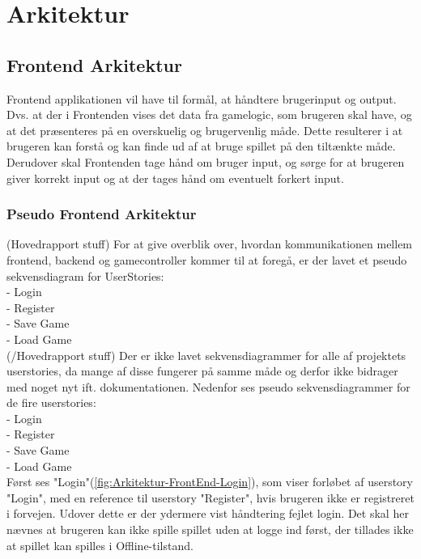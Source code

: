 \section{Arkitektur}
\subsection{Frontend Arkitektur}

Frontend applikationen vil have til formål, at håndtere brugerinput og output. Dvs. at der i Frontenden vises det data fra gamelogic, som brugeren skal have, og at det præsenteres på en overskuelig og brugervenlig måde. Dette resulterer i at brugeren kan forstå og kan finde ud af at bruge spillet på den tiltænkte måde.
Derudover skal Frontenden tage hånd om bruger input, og sørge for at brugeren giver korrekt input og at der tages hånd om eventuelt forkert input.

\subsubsection{Pseudo Frontend Arkitektur}
(Hovedrapport stuff)
For at give overblik over, hvordan kommunikationen mellem frontend, backend og gamecontroller kommer til at foregå, er der lavet et pseudo sekvensdiagram for UserStories:
\\
- Login\\
- Register\\
- Save Game\\
- Load Game\\
(/Hovedrapport stuff)
Der er ikke lavet sekvensdiagrammer for alle af projektets userstories, da mange af disse fungerer på samme måde og derfor ikke bidrager med noget nyt ift. dokumentationen.
Nedenfor ses pseudo sekvensdiagrammer for de fire userstories:\\
- Login\\
- Register\\
- Save Game\\
- Load Game\\

\noindent Først ses "Login"(\autoref{fig:Arkitektur-FrontEnd-Login}), som viser forløbet af userstory "Login", med en reference til userstory "Register", hvis brugeren ikke er registreret i forvejen. Udover dette er der ydermere vist håndtering fejlet login. Det skal her nævnes at brugeren kan ikke spille spillet uden at logge ind først, der tillades ikke at spillet kan spilles i Offline-tilstand.\\


